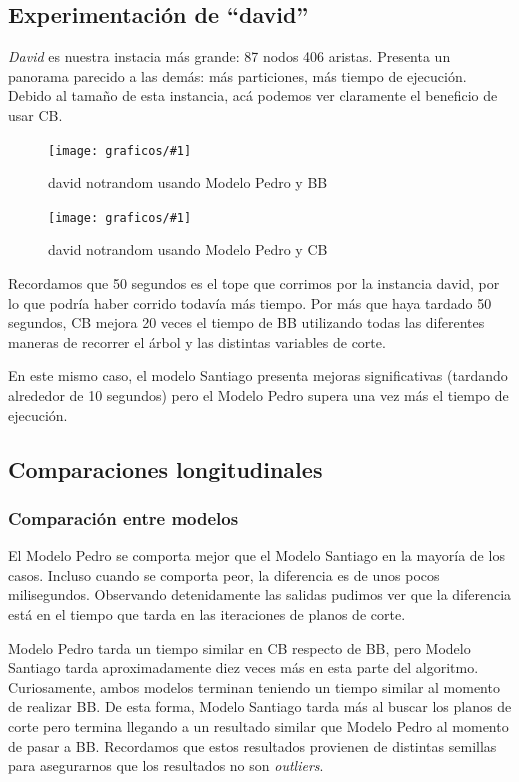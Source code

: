 \documentclass[a4paper, 10pt, twoside]{article}
\newcommand{\diagramavfig}[2]{%
  \begin{figure}[H]
    \texttt{[image: graficos/\#1]}%
    \caption{#2}
    \label{fig:#1}
  \end{figure}
}
\begin{document}
\subsection{Experimentación de ``david''}

\textit{David} es nuestra instacia más grande: 87 nodos 406 aristas. Presenta un panorama parecido a las demás: más particiones, más tiempo de ejecución. Debido al tamaño de esta instancia, acá podemos ver claramente el beneficio de usar CB.

\diagramavfig{david_notrandom_1_bb_0_segunJuntada}{david notrandom usando Modelo Pedro y BB}
\diagramavfig{david_notrandom_1_cb_0_segunJuntada}{david notrandom usando Modelo Pedro y CB}

Recordamos que 50 segundos es el tope que corrimos por la instancia david, por lo que podría haber corrido todavía más tiempo. Por más que haya tardado 50 segundos, CB mejora 20 veces el tiempo de BB utilizando todas las diferentes maneras de recorrer el árbol y las distintas variables de corte.

En este mismo caso, el modelo Santiago presenta mejoras significativas (tardando alrededor de 10 segundos) pero el Modelo Pedro supera una vez más el tiempo de ejecución.

\subsection{Comparaciones longitudinales}

\subsubsection{Comparación entre modelos}

El Modelo Pedro se comporta mejor que el Modelo Santiago en la mayoría de los casos. Incluso cuando se comporta peor, la diferencia es de unos pocos milisegundos. Observando detenidamente las salidas pudimos ver que la diferencia está en el tiempo que tarda en las iteraciones de planos de corte.

Modelo Pedro tarda un tiempo similar en CB respecto de BB, pero Modelo Santiago tarda aproximadamente diez veces más en esta parte del algoritmo. Curiosamente, ambos modelos terminan teniendo un tiempo similar al momento de realizar BB. De esta forma, Modelo Santiago tarda más al buscar los planos de corte pero termina llegando a un resultado similar que Modelo Pedro al momento de pasar a BB. Recordamos que estos resultados provienen de distintas semillas para asegurarnos que los resultados no son \textit{outliers}.
\end{document}
